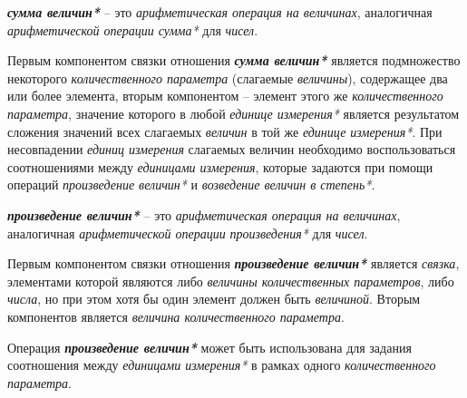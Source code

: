 \begin{SCn}
\end{SCn}

\textbf{\textit{сумма величин*}} -- это \textit{арифметическая операция на величинах}, аналогичная \textit{арифметической операции сумма*} для \textit{чисел}.
		
Первым компонентом связки отношения \textbf{\textit{сумма величин*}} является подмножество некоторого \textit{количественного параметра} (слагаемые \textit{величины}), содержащее два или более элемента, вторым компонентом -- элемент этого же \textit{количественного параметра}, значение которого в любой \textit{единице измерения*} является результатом сложения значений всех слагаемых \textit{величин} в той же \textit{единице измерения*}. При несовпадении \textit{единиц измерения} слагаемых величин необходимо воспользоваться соотношениями между \textit{единицами измерения}, которые задаются при помощи операций \textit{произведение величин*} и \textit{возведение величин в степень*}.
	
\begin{SCn}
\end{SCn}
	
\textbf{\textit{произведение величин*}} -- это \textit{арифметическая операция на величинах}, аналогичная \textit{арифметической операции} \textit{произведения*} для \textit{чисел}.
		
Первым компонентом связки отношения \textbf{\textit{произведение величин*}} является \textit{связка}, элементами которой являются либо \textit{величины количественных параметров}, либо \textit{числа}, но при этом хотя бы один элемент должен быть \textit{величиной}. Вторым компонентов является \textit{величина количественного параметра}.
		
Операция \textbf{\textit{произведение величин*}} может быть использована для задания соотношения между \textit{единицами измерения*} в рамках одного \textit{количественного параметра}.
%	
\begin{SCn}
\end{SCn}

